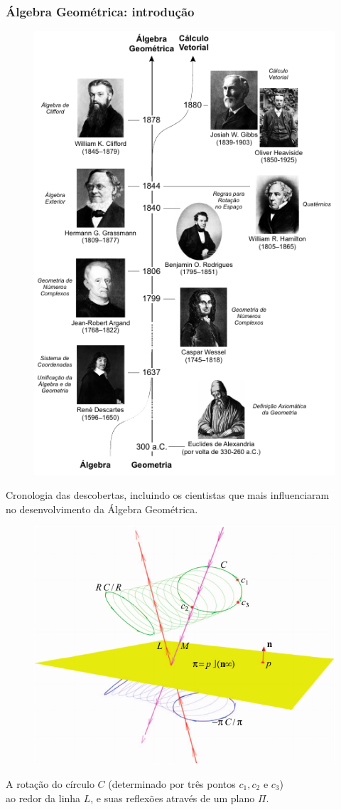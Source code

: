 \documentclass[10pt]{beamer}
\theoremstyle{plain}
\theoremstyle{definition}
\begin{document}
	\begin{frame}
		\frametitle{Álgebra Geométrica: introdução}
		\vspace{-1cm}
		\begin{figure}[H]
			\hspace{-6cm}
			\includegraphics[width=0.4\linewidth]{figures/GAcronologia.png}
			\label{fig:cronologia}
		\end{figure}
		\tiny Cronologia das descobertas, incluindo os cientistas que mais influenciaram \\no desenvolvimento da Álgebra Geométrica.
	
		\vspace{-6cm}
		
		\begin{figure}[H]
			\hspace{6cm}
			\includegraphics[width=0.4\linewidth]{figures/whyGA.png}
			\label{fig:lable}
		\end{figure}
	
		\hspace{6cm}
		A rotação do círculo $C$ (determinado por três pontos $c_1,c_2$ e $c_3$) \\
		\hspace{6cm} ao redor da linha $L$, e suas reflexões através de um plano $\Pi$.
	\end{frame}
\end{document}
